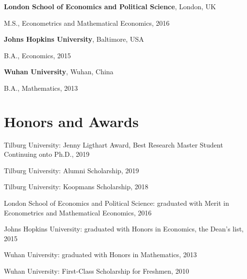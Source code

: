 \documentclass[margin,line]{res}
\newenvironment{list1}{
  \begin{list}{\ding{113}}{%
      \setlength{\itemsep}{0in}
      \setlength{\parsep}{0in} \setlength{\parskip}{0in}
      \setlength{\topsep}{0in} \setlength{\partopsep}{0in} 
      \setlength{\leftmargin}{0.17in}}}{\end{list}}
\begin{document}
\begin{resume}
{\bf London School of Economics and Political Science}, London, UK\\
\vspace*{-.1in}
\begin{list1}
\item[] M.S., Econometrics and Mathematical Economics, 2016
\end{list1}

{\bf Johns Hopkins University}, Baltimore, USA\\
\vspace*{-.1in}
\begin{list1}
\item[] B.A., Economics,  2015
\end{list1}

{\bf Wuhan University}, Wuhan, China\\
\vspace*{-.1in}
\begin{list1}
\item[] B.A., Mathematics,  2013
\end{list1}

\section{\sc Honors and Awards} 
Tilburg University: Jenny Ligthart Award, Best Research Master Student Continuing onto Ph.D., 2019

\vspace*{-2.5mm}
Tilburg University: Alumni Scholarship, 2019

\vspace*{-2.5mm}
Tilburg University: Koopmans Scholarship, 2018

\vspace*{-2.5mm}
London School of Economics and Political Science: graduated with Merit in Econometrics and Mathematical Economics, 2016

\vspace*{-2.5mm}
Johns Hopkins University: graduated with Honors in Economics, the Dean's list, 2015

\vspace*{-2.5mm}
Wuhan University: graduated with Honors in Mathematics, 2013

\vspace*{-2.5mm}
Wuhan University: First-Class Scholarship for Freshmen, 2010


\end{resume}
\end{document}
